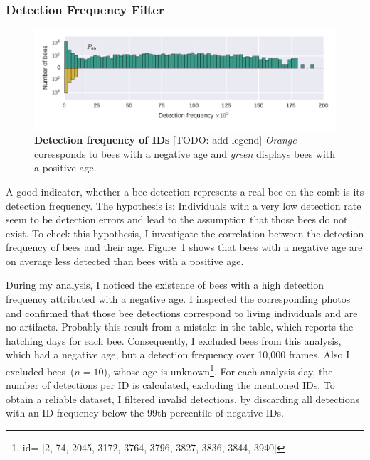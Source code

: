 \subsubsection{Detection Frequency Filter}
\label{subsubsec:dataset:filter}
\begin{figure}[t]
	\centering
	\includegraphics[width=1.0\textwidth]{Figures/filter}
	\caption[Detection frequency of IDs]{\textbf{Detection frequency of IDs} [TODO: add legend] \emph{Orange} coressponds to bees with a negative age and \emph{green} displays bees with a positive age.\protect\footnotemark}
	\label{fig:filter}
\end{figure}

A good indicator, whether a bee detection represents a real bee on the comb is its detection frequency.
The hypothesis is:
Individuals with a very low detection rate seem to be detection errors and lead to the assumption that those bees do not exist.
To check this hypothesis, I investigate the correlation between the detection frequency of bees and their age.
Figure~\ref{fig:filter} shows that bees with a negative age are on average less detected than bees with a positive age.

During my analysis, I noticed the existence of bees with a high detection frequency attributed with a negative age. I inspected the corresponding photos and confirmed that those bee detections correspond to living individuals and are no artifacts. Probably this result from a mistake in the table, which reports the hatching days for each bee.
Consequently, I excluded bees from this analysis, which had a negative age, but a detection frequency over 10,000 frames. Also I excluded bees~($n=10$), whose age is unknown\footnote{id= [2,
    74,
    2045,
    3172,
    3764,
    3796,
    3827,
    3836,
    3844,
    3940]}.
For each analysis day, the number of detections per ID is calculated, excluding the mentioned IDs.
To obtain a reliable dataset, I filtered invalid detections, by discarding all detections with an ID frequency below the 99th percentile of negative IDs.


